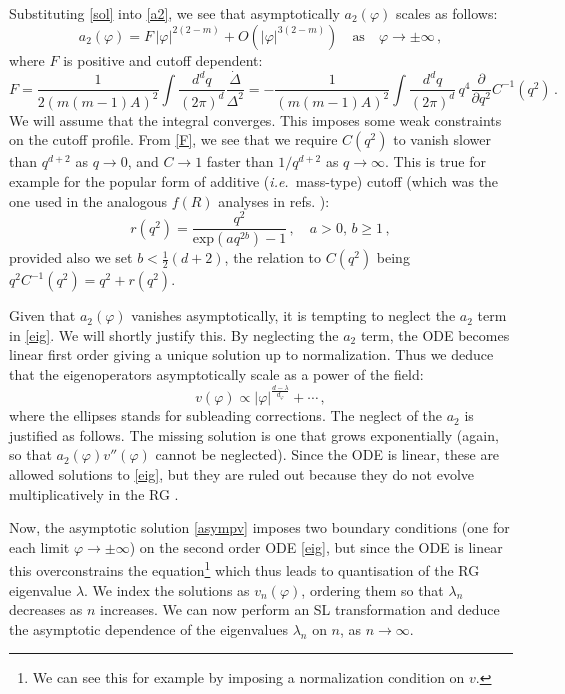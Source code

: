 \documentclass[11pt,a4paper]{article}
\numberwithin{figure}{section}
\numberwithin{equation}{section}
\newcommand{\be}{\begin{equation}}
\newcommand{\ee}{\end{equation}}
\newcommand\ie{\textit{i.e.}\ }
\newcommand{\ph}{\varphi}
\newcommand{\half}{\tfrac{1}{2}}
\begin{document}
Substituting \eqref{sol} into \eqref{a2}, we see that asymptotically $a_2(\ph)$ scales as follows:
\begin{equation}
    a_2(\ph) = F\,|\ph|^{2(2-m)} + O\left( |\ph|^{3(2-m)}\right) \quad \text{as} \quad \ph \rightarrow \pm \infty \,, \label{limA2}
\end{equation}
where $F$ is positive and cutoff dependent:
\begin{equation}
\label{F}
   F = \frac{1}{2\left(m(m-1)A\right)^2}  \int \frac{d^d q}{(2\pi)^d}\frac{\Dot{\Delta}}{\Delta^2} 
   = - \frac{1}{\left(m(m-1)A\right)^2} \int \frac{d^d q}{(2\pi)^d} \,q^4\frac{\partial}{\partial q^2} C^{-1}(q^2) \,.   
\end{equation}
We will assume that the integral converges. This imposes some weak constraints on the cutoff profile. From \eqref{F}, we see that we require  $C(q^2)$ to vanish slower than $q^{d+2}$ as $q\to0$, and $C\to1$ faster than $1/q^{d+2}$ as $q\to\infty$. This is true for example for the popular form of additive (\ie mass-type) cutoff \cite{Wetterich:1992} (which was the one used in the analogous $f(R)$ analyses in refs. \cite{Mitchell:2021qjr,Morris:2022btf}):
\begin{equation}
\label{wet}
    r(q^2)=\frac{q^2}{\text{exp}(aq^{2b})-1}\,, \quad a>0,\,b\geq 1 \,,
\end{equation}
provided also we set $b<\half(d+2)$, the relation to $C(q^2)$ being $q^2C^{-1}(q^2) = q^2 +r(q^2)$. 





Given that $a_2(\ph)$ vanishes asymptotically, it is tempting to neglect the $a_2$ term in \eqref{eig}. We will shortly justify this. By neglecting the $a_2 $ term, the ODE becomes linear first order giving a unique solution up to normalization. Thus we deduce that the eigenoperators asymptotically scale as a power of the field:
\be \label{asympv} v(\ph) \propto |\ph|^{\frac{d-\lambda}{d_\ph}} +\cdots\,, \ee
where the ellipses stands for subleading corrections. The neglect of the $a_2$ is justified as follows.
The missing solution is one that grows exponentially (again, so that $a_2(\ph) v''(\ph)$ cannot be neglected). Since the ODE is linear, these are allowed solutions to \eqref{eig}, but they are ruled out because they do not evolve multiplicatively in the RG \cite{Morris:1996nx,Morris:1998,Morris:1996xq,Bridle:2016nsu,Mitchell:2021qjr,Morris:2022btf}. 

Now, the asymptotic solution \eqref{asympv} imposes two boundary conditions (one for each limit $\ph\to\pm\infty$) on the second order ODE \eqref{eig}, but since the ODE is linear this overconstrains the equation\footnote{We can see this for example by imposing a normalization condition on $v$.} which thus leads to quantisation of the RG eigenvalue $\lambda$. We index the solutions as $v_n(\ph)$, ordering them so that $\lambda_n$ decreases as $n$ increases. We can now perform an SL transformation and deduce the asymptotic dependence of the eigenvalues $\lambda_n$ on $n$, as $n\to\infty$.
\end{document}
